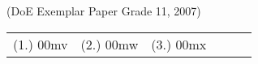 \begin{eocexercises}{}
\begin{enumerate}
(DoE Exemplar Paper Grade 11, 2007)
\end{enumerate}

\practiceinfo

\begin{tabular}[h]{cccccc}
(1.) 00mv & (2.) 00mw & (3.) 00mx & 
 \end{tabular}
\end{eocexercises}
